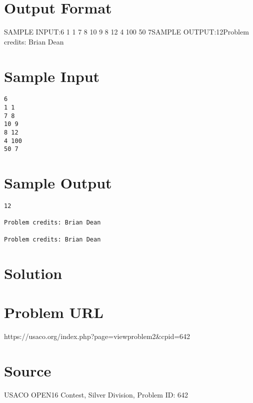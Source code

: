 \documentclass[12pt]{article}
\begin{document}
\section*{Output Format}
SAMPLE INPUT:6
1 1
7 8
10 9
8 12
4 100
50 7SAMPLE OUTPUT:12Problem credits: Brian Dean

\section*{Sample Input}
\begin{verbatim}
6
1 1
7 8
10 9
8 12
4 100
50 7
\end{verbatim}

\section*{Sample Output}
\begin{verbatim}
12

Problem credits: Brian Dean

Problem credits: Brian Dean
\end{verbatim}

\section*{Solution}


\section*{Problem URL}
https://usaco.org/index.php?page=viewproblem2&cpid=642

\section*{Source}
USACO OPEN16 Contest, Silver Division, Problem ID: 642
\end{document}
